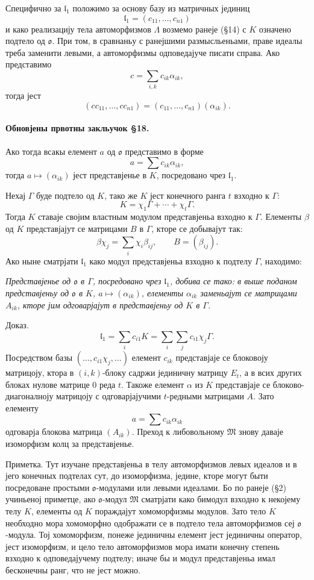 ﻿\documentclass[11pt]{article}
\providecommand{\mo}{\mathfrak{o}}
\providecommand{\ml}{\mathfrak{l}}
\providecommand{\mM}{\mathfrak{M}}
\begin{document}
Специфично за $\ml_1$ положимо за основу базу из матричных јединиц
\[
        \ml_1=(c_{11},\ldots,c_{n1})
\]
и како реализацију тела автоморфизмов $\Lambda$ возмемо ранеје (§14) с $K$ означено подтело од $\mo$. При том, в сравнаньу с ранејшими размысльеньами, праве идеалы треба заменити левыми, а автоморфизмы одповедајуче писати справа. Ако представимо
\[
        c=\sum_{i,k} c_{ik}\alpha_{ik},
\]
тогда јест
\[
        (cc_{11},\ldots,cc_{n1})=(c_{11},\ldots,c_{n1})(\alpha_{ik}).
\]

\paragraph{Обновјены првотны закльучок §18.}
Ако тогда всакы елемент $a$ од $\mo$ представимо в форме
\[
        a=\sum c_{ik}\alpha_{ik},
\]
тогда $a\mapsto(\alpha_{ik})$ јест представјенье в $K$, посредовано чрез $\ml_1$.

Нехај $\Gamma$ буде подтело од $K$, тако же $K$ јест конечного ранга $t$ взходно к $\Gamma$:
\[
        K=\chi_1\Gamma+\cdots+\chi_t\Gamma .
\]
Тогда $K$ ставаје својим властным модулом представјеньа взходно к $\Gamma$. Елементы $\beta$ од $K$ представјајут се матрицами $B$ в $\Gamma$, кторе се добывајут так:
\[
        \beta\chi_j=\sum_i\chi_i\beta_{ij},\qquad B=(\beta_{ij}).
\]
Ако ныне сматрјати $\ml_1$ како модул представјеньа взходно к подтелу $\Gamma$, находимо:

\emph{Представјенье од $\mo$ в $\Gamma$, посредовано чрез $\ml_1$, добива се тако: в выше поданом представјеньу од $\mo$ в $K$, $a\mapsto(\alpha_{ik})$, елементы $\alpha_{ik}$ заменьајут се матрицами $A_{ik}$, кторе јим одговарјајут в представјеньу од $K$ в $\Gamma$.}

Доказ.
\[
        \ml_1=\sum_i c_{i1}K=\sum_i\sum_j c_{i1}\chi_j\Gamma .
\]
Посредством базы $(\ldots,c_{i1}\chi_j,\ldots)$ елемент $c_{ik}$ представјаје се блоковоју матрицоју, ктора в $(i,k)$-блоку садржи јединичну матрицу $E_t$, а в всих других блоках нулове матрице $0$ реда $t$. Такоже елемент $\alpha$ из $K$ представјаје се блоково-диагоналноју матрицоју с одговарјајучими $t$-редными матрицами $A$. Зато елементу
\[
        a=\sum c_{ik}\alpha_{ik}
\]
одговарја блокова матрица $(A_{ik})$. Преход к либовольному $\mM$ знову даваје изоморфизм колц за представјенье.

Приметка. Тут изучане представјеньа в телу автоморфизмов левых идеалов и в јего конечных подтелах сут, до изоморфизма, једине, кторе могут быти посредоване простыми $\mo$-модулами или левыми идеалами. Бо по ранеје (§2) учиньеној приметце, ако $\mo$-модул $\mM$ сматрјати како бимодул взходно к некојему телу $K$, елементы од $K$ пораждајут хомоморфизмы модулов. Зато тело $K$ необходно мора хомоморфно одображати се в подтело тела автоморфизмов сеј $\mo$-модула. Тој хомоморфизм, понеже јединичны елемент јест јединичны оператор, јест изоморфизм, и цело тело автоморфизмов мора имати конечну степень взходно к одповедајучему подтелу; иначе бы и модул представјеньа имал бесконечны ранг, что не јест можно.
\end{document}
